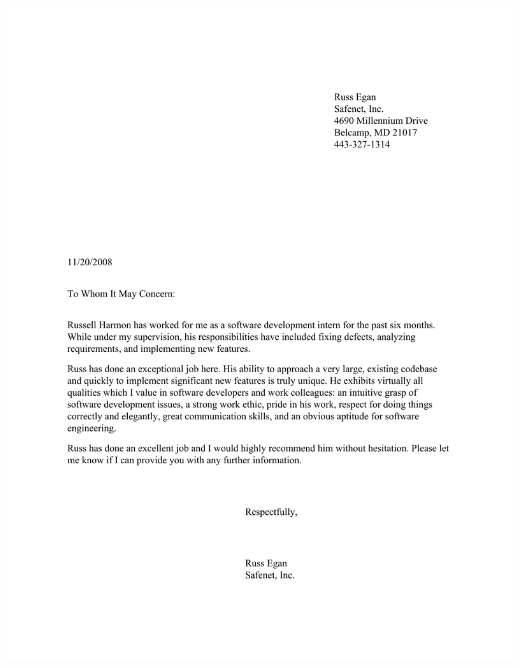 \documentclass[margin]{res}
\begin{document}
\includegraphics{sfnt-recommendation.pdf}
\end{document}

